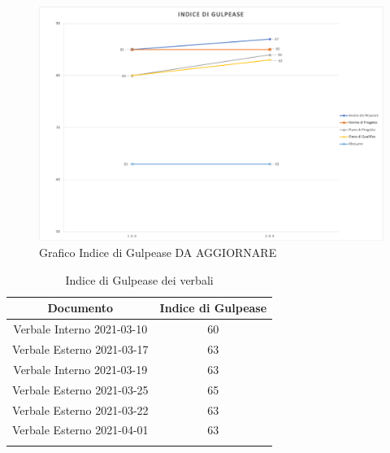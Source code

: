 \begin{center}
    \begin{figure}[!htb]
        \centering
        \includegraphics[scale=0.60]{res/images/grafico_gulpease_rp.png}
        \caption{Grafico Indice di Gulpease DA AGGIORNARE}
    \end{figure}
    \begin{center}
        \begin{longtable}{|c|c|}
            \hline
            \rowcolor{lighter-grayer}
            \textbf{Documento}         & \textbf{Indice di Gulpease} \\
            \hline
            \endfirsthead

            \hline
            Verbale Interno 2021-03-10 & 60                          \\
            Verbale Esterno 2021-03-17 & 63                          \\      
            Verbale Interno 2021-03-19 & 63                          \\     
            Verbale Esterno 2021-03-25 & 65                          \\ 
            Verbale Esterno 2021-03-22 & 63                          \\ 
            Verbale Esterno 2021-04-01 & 63                          \\     
            \hline
            \rowcolor{white}
            \caption{Indice di Gulpease dei verbali}
        \end{longtable}
    \end{center}
\end{center}

